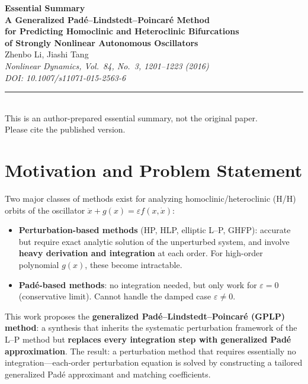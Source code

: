 \documentclass[11pt,a4paper]{article}
\begin{document}
\raggedbottom

\begin{center}
{\LARGE\bfseries\color{primary}Essential Summary}\\[12pt]
{\large\bfseries A Generalized Pad\'e--Lindstedt--Poincar\'e Method\\for Predicting Homoclinic and Heteroclinic Bifurcations\\of Strongly Nonlinear Autonomous Oscillators}\\[8pt]
{\normalsize Zhenbo Li, Jiashi Tang}\\[4pt]
{\small\itshape Nonlinear Dynamics, Vol.\ 84, No.\ 3, 1201--1223 (2016)\\[2pt] DOI: 10.1007/s11071-015-2563-6}\\[6pt]
{\small\rule{0.7\textwidth}{0.5pt}}\\[4pt]
{\small\color{accent}This is an author-prepared essential summary, not the original paper.\\Please cite the published version.}
\end{center}\vspace{0.3em}

\section{Motivation and Problem Statement}

Two major classes of methods exist for analyzing homoclinic/heteroclinic (H/H) orbits of the oscillator $\ddot{x}+g(x)=\varepsilon f(x,\dot{x})$:

\begin{itemize}[leftmargin=2em]
\item \textbf{Perturbation-based methods} (HP, HLP, elliptic L--P, GHFP): accurate but require exact analytic solution of the unperturbed system, and involve \textbf{heavy derivation and integration} at each order. For high-order polynomial $g(x)$, these become intractable.
\item \textbf{Pad\'e-based methods}: no integration needed, but only work for $\varepsilon=0$ (conservative limit). Cannot handle the damped case $\varepsilon\neq 0$.
\end{itemize}

This work proposes the \textbf{generalized Pad\'e--Lindstedt--Poincar\'e (GPLP) method}: a synthesis that inherits the systematic perturbation framework of the L--P method but \textbf{replaces every integration step with generalized Pad\'e approximation}. The result: a perturbation method that requires essentially no integration---each-order perturbation equation is solved by constructing a tailored generalized Pad\'e approximant and matching coefficients.
\end{document}
